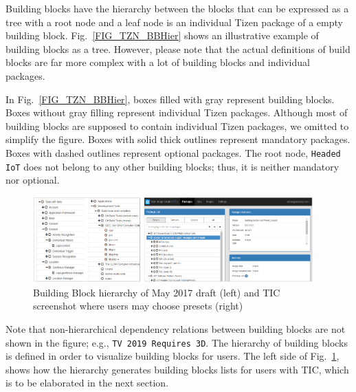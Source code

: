 Building blocks have the hierarchy between the blocks that can be expressed as a tree with a root node and a leaf node is an individual Tizen package of a empty building block.
Fig.~\ref{FIG_TZN_BBHier} shows an illustrative example of building blocks as a tree.
However, please note that the actual definitions of build blocks are far more complex with a lot of building blocks and individual packages.


In Fig.~\ref{FIG_TZN_BBHier}, boxes filled with gray represent building blocks.
Boxes without gray filling represent individual Tizen packages.
Although most of building blocks are supposed to contain individual Tizen packages, we omitted to simplify the figure.
Boxes with solid thick outlines represent mandatory packages.
Boxes with dashed outlines represent optional packages.
The root node, \texttt{Headed IoT} does not belong to any other building blocks; thus, it is neither mandatory nor optional.


\begin{figure}
\centering
\includegraphics[width=0.96\textwidth]{figures/tic_pkglist_domains_options_presets.png}
\vspace{-0.1cm}
\caption{Building Block hierarchy of May 2017 draft (left) and TIC screenshot where users may choose presets (right)}
\label{FIG_TZN_TIC_SCRSHOT}
\vspace{-0.1cm}
\end{figure}


Note that non-hierarchical dependency relations between building blocks are not shown in the figure; e.g., \texttt{TV 2019 Requires 3D}. The hierarchy of building blocks is defined in order to visualize building blocks for users.
The left side of Fig.~\ref{FIG_TZN_TIC_SCRSHOT}, shows how the hierarchy generates building blocks lists for users with TIC, which is to be elaborated in the next section.


